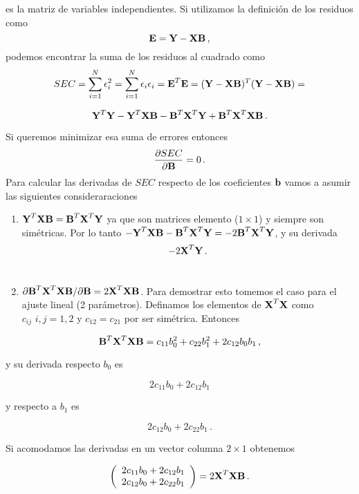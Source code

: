 \documentclass[
]{agujournal2019}
\begin{document}
es la matriz de variables independientes. Si utilizamos la definición de
los residuos como \[{\textbf E}={\textbf Y}-{\textbf X}{\textbf B}\,,\]
podemos encontrar la suma de los residuos al cuadrado como
\[SEC=\sum^N_{i=1} \epsilon^2_i=\sum^N_{i=1} \epsilon_i \epsilon_i=
{\textbf E}^T{\textbf E}=({\textbf Y}-{\textbf X}{\textbf B})^T({\textbf Y}-{\textbf X}{\textbf B})=\]

\[{\textbf Y}^T{\textbf Y} - {\textbf Y}^T{\textbf X}{\textbf B}-{\textbf B}^T{\textbf X}^T{\textbf Y}+{\textbf B}^T
{\textbf X}^T{\textbf X}{\textbf B}\,.\]

\noindent Si queremos minimizar esa suma de errores entonces
\[\frac{\partial{SEC}}{\partial{\textbf B}}=0\,.\] Para calcular las
derivadas de \({SEC}\) respecto de los coeficientes \({\textbf b}\)
vamos a asumir las siguientes consideraraciones\\

\begin{enumerate}
\def\labelenumi{(\roman{enumi})}
\item
  \({\textbf Y}^T{\textbf X}{\textbf B}={\textbf B}^T{\textbf X}^T{\textbf Y}\)
  ya que son matrices elemento (\(1\times1\)) y siempre son simétricas.
  Por lo tanto
  \(-{\textbf Y}^T{\textbf X}{\textbf B}-{\textbf B}^T{\textbf X}^T{\textbf Y}=-2{\textbf B}^T{\textbf X}^T{\textbf Y}\),
  y su derivada \[-2{\textbf X}^T{\textbf Y}\,.\]\\
\item
  \(\partial{{\textbf B}^T{\textbf X}^T{\textbf X}{\textbf B}}/\partial{\textbf B}=2{\textbf X}^T{\textbf X}{\textbf B}\).
  Para demostrar esto tomemos el caso para el ajuste lineal (2
  parámetros). Definamos los elementos de \({\textbf X}^T{\textbf X}\)
  como \(c_{ij}\,\,i,j=1,2\) y \(c_{12}=c_{21}\) por ser simétrica.
  Entonces
\end{enumerate}

\[{\textbf B}^T{\textbf X}^T{\textbf X}{\textbf B}=c_{11}b_0^2+c_{22}b_1^2 + 2c_{12} b_0 b_1\,,\]

y su derivada respecto \(b_0\) es

\[2c_{11}b_0 + 2c_{12}b_1\]

y respecto a \(b_1\) es

\[2c_{12}b_0 + 2c_{22}b_1\,.\]

Si acomodamos las derivadas en un vector columna \(2\times1\) obtenemos

\[\left(\begin{array}{c}
  2c_{11}b_0 + 2c_{12}b_1 \\
  2c_{12}b_0 + 2c_{22}b_1 \\
        \end{array}\right)=2{\textbf X}^T{\textbf X}{\textbf B}\,.\]
\end{document}
